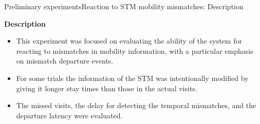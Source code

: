 \begin{frame}{Preliminary experiments}{Reaction to STM mobility mismatches: Description}
\begin{block}{\small \textbf{Description}}
{ 
\small
\begin{itemize}
  \item This experiment was focused on evaluating the ability of the system for reacting to mismatches in mobility information, with a particular emphasis on mismatch departure events.
  \item For some trials the information of the STM was intentionally modified by giving it longer stay times than those in the actual visits.
  \item The missed visits, the delay for detecting the temporal mismatches, and the departure latency were evaluated.
\end{itemize}
}
\end{block}

\begin{table}
\centering
\renewcommand{\arraystretch}{0.8}
\end{table}
\end{frame}
